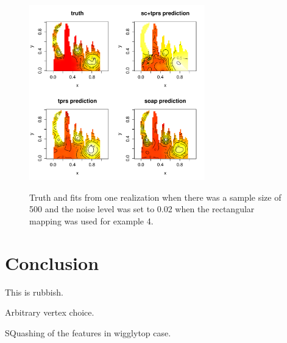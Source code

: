 \documentclass[a4paper,10pt]{amsart}
\begin{document}
\begin{figure}
\centering
\includegraphics[width=3in]{figs-otherdomains/wigglytop2-bbox-real.pdf} \\
\caption{Truth and fits from one realization when there was a sample size of 500 and the noise level was set to 0.02 when the rectangular mapping was used for example 4.}
\label{wigglytop2-bbox-real}
\end{figure}


\section{Conclusion}

This is rubbish.

Arbitrary vertex choice.

SQuashing of the features in wigglytop case.














\end{document}

